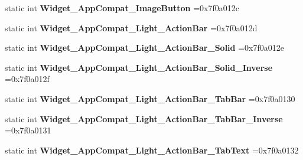 \begin{DoxyCompactItemize}
\item 
\mbox{\label{classandroid_1_1support_1_1graphics_1_1drawable_1_1R_1_1style_ac2f6393eed0b8afa4afadc9a80428460}} 
static int {\bfseries Widget\+\_\+\+App\+Compat\+\_\+\+Image\+Button} =0x7f0a012c
\item 
\mbox{\label{classandroid_1_1support_1_1graphics_1_1drawable_1_1R_1_1style_a1ebaba68b37db81e1cf2036dd819cf59}} 
static int {\bfseries Widget\+\_\+\+App\+Compat\+\_\+\+Light\+\_\+\+Action\+Bar} =0x7f0a012d
\item 
\mbox{\label{classandroid_1_1support_1_1graphics_1_1drawable_1_1R_1_1style_acefdaf079947d2964ce98c0f4d29188a}} 
static int {\bfseries Widget\+\_\+\+App\+Compat\+\_\+\+Light\+\_\+\+Action\+Bar\+\_\+\+Solid} =0x7f0a012e
\item 
\mbox{\label{classandroid_1_1support_1_1graphics_1_1drawable_1_1R_1_1style_ab02c84bdd1958655f9017a089b2f3cbb}} 
static int {\bfseries Widget\+\_\+\+App\+Compat\+\_\+\+Light\+\_\+\+Action\+Bar\+\_\+\+Solid\+\_\+\+Inverse} =0x7f0a012f
\item 
\mbox{\label{classandroid_1_1support_1_1graphics_1_1drawable_1_1R_1_1style_a2e7407a0a981713013ebc2a254cb754b}} 
static int {\bfseries Widget\+\_\+\+App\+Compat\+\_\+\+Light\+\_\+\+Action\+Bar\+\_\+\+Tab\+Bar} =0x7f0a0130
\item 
\mbox{\label{classandroid_1_1support_1_1graphics_1_1drawable_1_1R_1_1style_aaed5e26768d7adcd2c1137ecb8ba7ca6}} 
static int {\bfseries Widget\+\_\+\+App\+Compat\+\_\+\+Light\+\_\+\+Action\+Bar\+\_\+\+Tab\+Bar\+\_\+\+Inverse} =0x7f0a0131
\item 
\mbox{\label{classandroid_1_1support_1_1graphics_1_1drawable_1_1R_1_1style_a44a898c619d9277f017c34fbbda26df1}} 
static int {\bfseries Widget\+\_\+\+App\+Compat\+\_\+\+Light\+\_\+\+Action\+Bar\+\_\+\+Tab\+Text} =0x7f0a0132

\end{DoxyCompactItemize}
